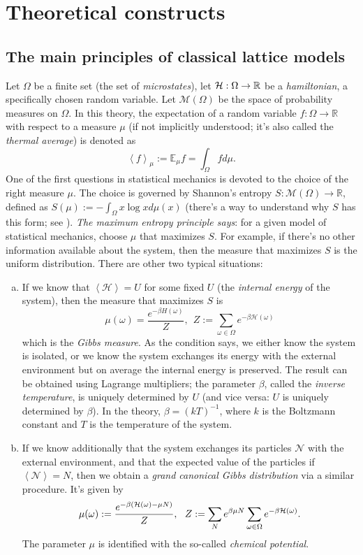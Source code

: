 \section{Theoretical constructs}
\subsection{The main principles of classical lattice models}
Let $\Omega$ be a finite set (the set of \emph{microstates}), let $\mathcal{H} : \Omega \rightarrow \mathbb R$ be a \emph{hamiltonian}, a specifically chosen random variable. Let $\mathcal M(\Omega)$ be the space of probability measures on $\Omega$. In this theory, the expectation of a random variable $f : \Omega \rightarrow \mathbb R$ with respect to a measure $\mu$ (if not implicitly understood; it's also called the \emph{thermal average}) is denoted as
\[
\left\langle f \right\rangle_{\mu} := \mathbb E_{\mu} f = \int_{\Omega} f d\mu.
\]
One of the first questions in statistical mechanics is devoted to the choice of the right measure $\mu$. The choice is governed by Shannon's entropy $S : \mathcal M(\Omega) \rightarrow \mathbb R$, defined as $S(\mu) := -\int_{\Omega}x\log x d\mu(x)$ (there's a way to understand why $S$ has this form; see \cite{friedli}). \emph{The maximum entropy principle says}: for a given model of statistical mechanics, choose $\mu$ that maximizes $S$. For example, if there's no other information available about the system, then the measure that maximizes $S$ is the uniform distribution. There are other two typical situations:
\begin{enumerate}[(a)]
\item If we know that $\left\langle \mathcal H\right\rangle = U$ for some fixed $U$ (the \emph{internal energy} of the system), then the measure that maximizes $S$ is 
\[
\mu(\omega) = \frac{e^{-\beta H(\omega)}}{Z}, \ \ Z:= \sum_{\omega \in \Omega} e^{-\beta \mathcal H(\omega)} 
\]
which is the \emph{Gibbs measure}. As the condition says, we either know the system is isolated, or we know the system exchanges its energy with the external environment but on average the internal energy is preserved. The result can be obtained using Lagrange multipliers; the parameter $\beta$, called the \emph{inverse temperature}, is uniquely determined by $U$ (and vice versa: $U$ is uniquely determined by $\beta$). In the theory, $\beta = (kT)^{-1}$, where $k$ is the Boltzmann constant and $T$ is the temperature of the system.
\item If we know additionally that the system exchanges its particles $\mathcal N$ with the external environment, and that the expected value of the particles if $\left\langle \mathcal N \right\rangle = N$, then we obtain a \emph{grand canonical Gibbs distribution} via a similar procedure. It's given by
\[
\mu(\omega) := \frac{e^{-\beta(\mathcal{H}(\omega)-\mu N)}}{Z}, \ \ Z := \sum_{N} e^{\beta \mu N} \sum_{\omega \in \Omega} e^{-\beta \mathcal{H} (\omega)}.
\]
The parameter $\mu$ is identified with the so-called \emph{chemical potential}.
\end{enumerate}

